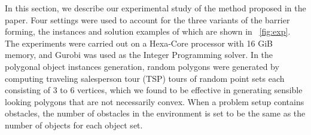 In this section, we describe our experimental study of the method proposed in the paper.
Four settings were used to account for the three variants of the barrier forming, the instances and solution examples of which are shown in ~\ref{fig:exp}. 
The experiments were carried out on a Hexa-Core processor with 16 GiB memory, and Gurobi
\cite{optimization2019gurobi} was used as the Integer Programming solver.
In the polygonal object instances generation, random polygons were generated by computing traveling salesperson tour (TSP) tours of random point sets each consisting of $3$ to $6$ vertices, which we found to be effective in generating sensible looking polygons that are not necessarily convex.
%
When a problem setup contains obstacles, the number of obstacles in the environment is set to be the same as the number of objects for each object set.


